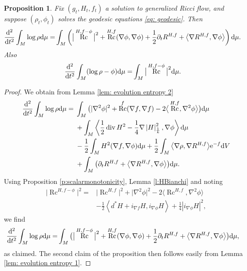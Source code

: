 \documentclass[11pt]{article}
\numberwithin{equation}{section}
\numberwithin{equation}{section}
\newtheorem{prop}[thm]{Proposition}
 { \theoremstyle{definition}
\newtheorem{defn}[thm]{Definition}
\newtheorem{Note}[thm]{Note}
\newtheorem{Example}[thm]{Example}
\newtheorem{rmk}[thm]{Remark} }
\newcommand{\del}{\partial}
\newcommand{\brs}[1]{\left| #1 \right|}
\newcommand{\N}{\nabla}
\newcommand{\IP}[1]{\left<#1\right>}
\newcommand{\wnorm}[1]{\left|#1\right|^2_{\frac1k}}
\DeclareMathOperator{\Rc}{Rc}
\DeclareMathOperator{\divg}{div}
\begin{document}
\begin{prop} \label{prop:entropyconvexity} Fix $(g_t, H_t, f_t)$ a solution to generalized Ricci flow, and suppose $(\rho_t,\phi_t)$ solves the geodesic equations \eqref{eq: geodesic}. Then
 \begin{align*}
	\frac{{\rm d}^2}{{\rm d}t^2}\int_M \log\rho {\rm d}\mu
	=&\int_M \left(\big|\Rc^{H,f-\phi}\big|^2 + \Rc^{H,f}(\N\phi,\N\phi)+\frac12\del_t R^{H,f}+\big\langle\N R^{H,f},\N\phi\big\rangle \right) {\rm d}\mu.
	\end{align*}
 Also
	\begin{align*}
	\frac{{\rm d}^2}{{\rm d}t^2}\int_M (\log\rho-\phi) {\rm d}\mu
	=&\int_M \big|\Rc^{H,f-\phi}\big|^2 {\rm d}\mu.
	\end{align*}
\end{prop}
\begin{proof}
We obtain from Lemma \ref{lem: evolution entropy 2}
\begin{align*}
 \frac{{\rm d}^2}{{\rm d}t^2}\int_M \log\rho {\rm d}\mu={}&\int_M \big(|\N^2\phi|^2+\Rc^f(\N f,\N f)-2\big\langle\Rc^{H,f},\N^2\phi\big\rangle \big) {\rm d}\mu\\
	&+\int_M \IP{\frac12\divg H^2-\frac1{4}\N\wnorm{H},\N\phi} {\rm d}\mu\\
	&-\frac12\int_M H^2(\N f,\N\phi) {\rm d}\mu+\frac12\int_M \big\langle\N\rho,\N R^{H,f}\big\rangle{\rm e}^{-f} {\rm d}V\\
	&+\int_M \big(\del_t R^{H,f}+\big\langle\N R^{H,f},\N \phi\big\rangle \big) {\rm d}\mu.
\end{align*}
Using Proposition \ref{p:scalarmonotonicity}, Lemma \ref{l:HBianchi} and noting
\begin{align*}
	\big|\Rc^{H,f-\phi}\big|^2={}&\big|\Rc^{H,f}\big|^2+ \big|\N^2\phi\big|^2-2\big\langle\Rc^{H,f},\N^2\phi\big\rangle
	\\&-\frac12\IP{d^*H+i_{\N f}H,i_{\N\phi}H}+\frac14 \brs{i_{\N\phi}H}^2,
	\end{align*}
 we find
 \begin{align*}
 \frac{{\rm d}^2}{{\rm d}t^2}\int_M \log\rho {\rm d}\mu
	=&\int_M \big(\big|\Rc^{H,f-\phi}\big|^2 + \Rc^{H,f}(\N\phi,\N\phi)+\frac12\del_t R^{H,f}+\big\langle\N R^{H,f},\N\phi\big\rangle \big) {\rm d}\mu,
\end{align*}
as claimed. The second claim of the proposition then follows easily from Lemma \ref{lem: evolution entropy 1}.
\end{proof}
\end{document}
